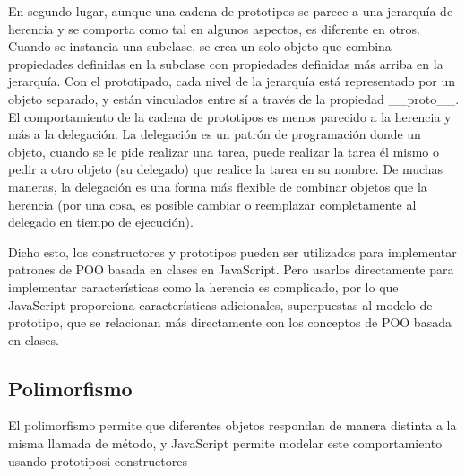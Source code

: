 \documentclass{article}
\begin{document}
En segundo lugar, aunque una cadena de prototipos se parece a una jerarquía 
de herencia y se comporta como tal en algunos aspectos, es diferente en 
otros. Cuando se instancia una subclase, se crea un solo objeto que combina 
propiedades definidas en la subclase con propiedades definidas más arriba 
en la jerarquía. Con el prototipado, cada nivel de la jerarquía está 
representado por un objeto separado, y están vinculados entre sí a través 
de la propiedad \_\_proto\_\_. El comportamiento de la cadena de prototipos 
es menos parecido a la herencia y más a la delegación. La delegación es un 
patrón de programación donde un objeto, cuando se le pide realizar una 
tarea, puede realizar la tarea él mismo o pedir a otro objeto (su delegado) 
que realice la tarea en su nombre. De muchas maneras, la delegación es una 
forma más flexible de combinar objetos que la herencia 
(por una cosa, es posible cambiar o reemplazar completamente al delegado en 
tiempo de ejecución).

Dicho esto, los constructores y prototipos pueden ser utilizados para 
implementar patrones de POO basada en clases en JavaScript. Pero usarlos 
directamente para implementar características como la herencia es complicado, 
por lo que JavaScript proporciona características adicionales, superpuestas 
al modelo de prototipo, que se relacionan más directamente con los conceptos 
de POO basada en clases.

\subsection{Polimorfismo}

El polimorfismo permite que diferentes objetos respondan de manera distinta 
a la misma llamada de método, y JavaScript permite modelar este comportamiento
usando prototiposi constructores
\end{document}
